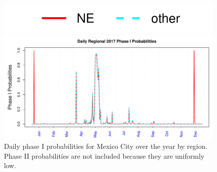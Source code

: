\documentclass[alpha-refs]{wiley-article}
\begin{document}
\vspace{-10mm}

\begin{figure}[H]
  \begin{center}
    \hspace{.1\textwidth}
  \includegraphics[width=.6\textwidth]{phase_reg_legend2}



  \vspace{-6mm}

      \includegraphics[width=\textwidth]{phase_prob_all_day_reg}
  \end{center}
  \vspace{-8mm}
       \caption{Daily phase I probabilities for Mexico City over the year by region. Phase II probabilities are not included because they are uniformly low.}\label{fig:phase_region}
\end{figure}
\vspace{-3mm}
\end{document}
